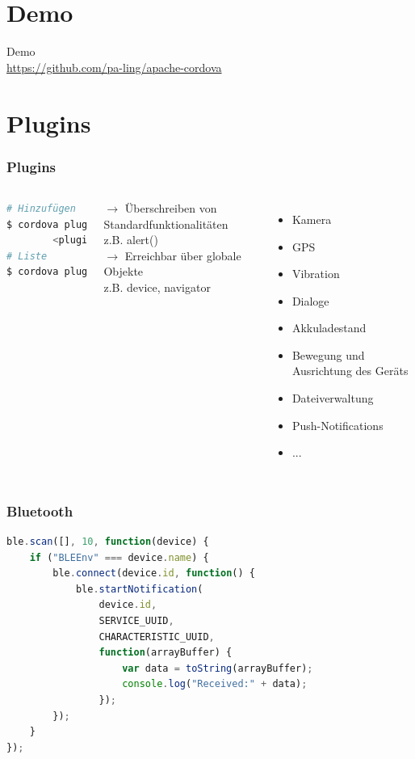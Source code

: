 \documentclass[xcolor=dvipsnames]{beamer}
\begin{document}
\section{Demo}
\begin{frame}
	\centering
	{\LARGE \textcolor{cordovablue}{Demo}}\\
	\vspace{4ex}
	\href{https://github.com/pa-ling/apache-cordova}{https://github.com/pa-ling/apache-cordova}
\end{frame}

\section{Plugins}
\begin{frame}[fragile]\frametitle{Plugins}
	\begin{columns}[t,onlytextwidth]
		\begin{lstlisting}[language=Python]
# Hinzufügen
$ cordova plugin add \
		<plugin>
# Liste
$ cordova plugin ls
		\end{lstlisting}
		$\rightarrow$ Überschreiben von Standardfunktionalitäten 
		\\z.B. alert()\\
		$\rightarrow$ Erreichbar über globale Objekte
		\\z.B. device, navigator
		\begin{itemize}
			\item Kamera
			\item GPS
			\item Vibration
			\item Dialoge
			\item Akkuladestand
			\item Bewegung und Ausrichtung des Geräts
			\item Dateiverwaltung
			\item Push-Notifications
			\item ...
		\end{itemize}
	\end{columns}
\end{frame}

\lstset{numbers=left}
\begin{frame}[fragile]\frametitle{Bluetooth}
	\begin{lstlisting}[language=JavaScript]
ble.scan([], 10, function(device) {
	if ("BLEEnv" === device.name) {
		ble.connect(device.id, function() {
			ble.startNotification(
				device.id,
				SERVICE_UUID,
				CHARACTERISTIC_UUID, 
				function(arrayBuffer) {
					var data = toString(arrayBuffer);
					console.log("Received:" + data);
				});
		});
	}
});
\end{lstlisting}
\end{frame}
\end{document}

